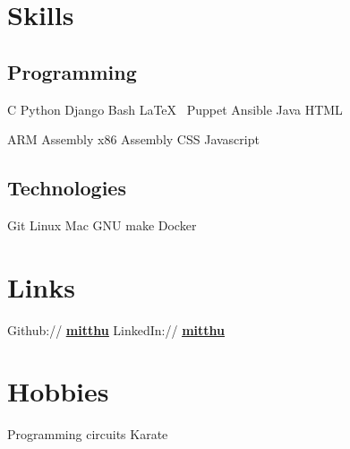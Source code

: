 \documentclass[]{deedy}
\newcommand{\linkstyle}[1]{\textbf{\ul{#1}}}
\let\oldhref\href
\renewcommand{\href}[2]{%
\oldhref{#1}{\linkstyle{#2}}%
}
\begin{document}
\begin{minipage}[t]{0.33\textwidth}
\section{Skills}
\subsection{Programming}
C \textbullet{} Python \textbullet{} Django \textbullet{} Bash \textbullet{} \LaTeX\ \textbullet{} Puppet \textbullet{} Ansible \textbullet{} Java \textbullet{} HTML
\sectionsep

ARM Assembly \textbullet{} x86 Assembly \textbullet{} CSS \textbullet{} Javascript
\sectionsep

\subsection{Technologies}
Git \textbullet{} Linux \textbullet{} Mac \textbullet{} GNU make \textbullet{} Docker %

\section{Links} 
Github:// \href{https://github.com/mitthu}{mitthu} \textbullet{} 
LinkedIn://  \href{https://www.linkedin.com/in/mitthu}{mitthu}

\section{Hobbies}
Programming circuits \textbullet{} Karate

\end{minipage}
\vrule{}
\hfill
\end{document}

